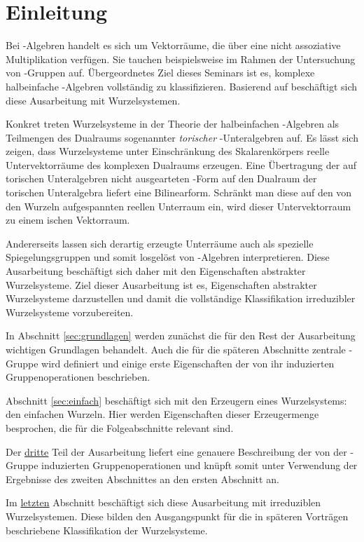\section*{Einleitung}

Bei \lie\hyp{}Algebren handelt es sich um Vektorräume, die über eine nicht assoziative Multiplikation verfügen.
Sie tauchen beispielsweise im Rahmen der Untersuchung von \lie\hyp{}Gruppen auf.
Übergeordnetes Ziel dieses Seminars ist es, komplexe halbeinfache \lie\hyp{}Algebren vollständig zu klassifizieren.
Basierend auf \cite[S.49-55]{humphreys1972introduction} beschäftigt sich diese Ausarbeitung mit Wurzelsystemen.

Konkret treten Wurzelsysteme in der Theorie der halbeinfachen \lie\hyp{}Algebren als Teilmengen des Dualraums sogenannter \emph{torischer} \lie\hyp{}Unteralgebren auf.
Es lässt sich zeigen, dass Wurzelsysteme unter Einschränkung des Skalarenkörpers reelle Untervektorräume des komplexen Dualraums erzeugen.
Eine Übertragung der auf torischen Unteralgebren nicht ausgearteten \killing\hyp{}Form auf den Dualraum der torischen Unteralgebra liefert eine Bilinearform.
Schränkt man diese auf den von den Wurzeln aufgespannten reellen Unterraum ein, wird dieser Untervektorraum zu einem \euklid ischen Vektorraum.

Andererseits lassen sich derartig erzeugte Unterräume auch als spezielle Spiegelungsgruppen und somit losgelöst von \lie\hyp{}Algebren interpretieren.
Diese Ausarbeitung beschäftigt sich daher mit den Eigenschaften abstrakter Wurzelsysteme.
Ziel dieser Ausarbeitung ist es, Eigenschaften abstrakter Wurzelsysteme darzustellen und damit die vollständige Klassifikation irreduzibler Wurzelsysteme vorzubereiten.

In Abschnitt \ref{sec:grundlagen} werden zunächst die für den Rest der Ausarbeitung wichtigen Grundlagen behandelt.
Auch die für die späteren Abschnitte zentrale \weyl\hyp{}Gruppe wird definiert und einige erste Eigenschaften der von ihr induzierten Gruppenoperationen beschrieben.

Abschnitt \ref{sec:einfach} beschäftigt sich mit den Erzeugern eines Wurzelsystems: den einfachen Wurzeln. 
Hier werden Eigenschaften dieser Erzeugermenge besprochen, die für die Folgeabschnitte relevant sind.

Der \hyperref[sec:weylgroup]{dritte} Teil der Ausarbeitung liefert eine genauere Beschreibung der von der \weyl\hyp{}Gruppe induzierten Gruppenoperationen und knüpft somit unter Verwendung der Ergebnisse des zweiten Abschnittes an den ersten Abschnitt an.

Im \hyperref[sec:irreduc]{letzten} Abschnitt beschäftigt sich diese Ausarbeitung mit irreduziblen Wurzelsystemen. 
Diese bilden den Ausgangspunkt für die in späteren Vorträgen beschriebene Klassifikation der Wurzelsysteme.
